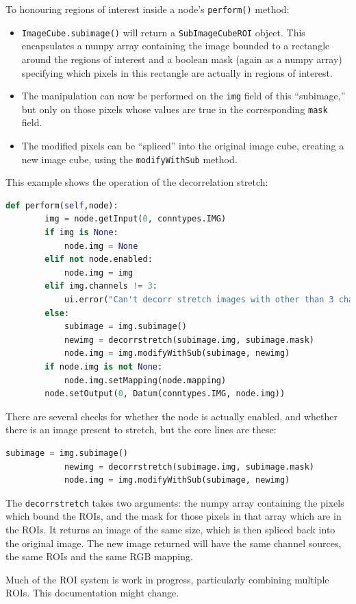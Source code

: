To honouring regions of interest inside a node's \texttt{perform()} method:
\begin{itemize}
\item \texttt{ImageCube.subimage()} will return a \texttt{SubImageCubeROI} object. This encapsulates
a numpy array containing the image bounded to a rectangle around the regions of interest and
a boolean mask (again as a numpy array) specifying which pixels in this rectangle are actually
in regions of interest.
\item The manipulation can now be performed on the \texttt{img} field of this ``subimage,'' but
only on those pixels whose values are true in the corresponding \texttt{mask} field.
\item The modified pixels can be ``spliced'' into the original image cube, creating a new image
cube, using the \texttt{modifyWithSub} method.
\end{itemize}
This example shows the operation of the decorrelation stretch:
\begin{lstlisting}[language=Python]
    def perform(self,node):
        img = node.getInput(0, conntypes.IMG)
        if img is None:
            node.img = None
        elif not node.enabled:
            node.img = img
        elif img.channels != 3:
            ui.error("Can't decorr stretch images with other than 3 channels")
        else:
            subimage = img.subimage()
            newimg = decorrstretch(subimage.img, subimage.mask)
            node.img = img.modifyWithSub(subimage, newimg)
        if node.img is not None:
            node.img.setMapping(node.mapping)
        node.setOutput(0, Datum(conntypes.IMG, node.img))
\end{lstlisting}
There are several checks for whether the node is actually enabled, and whether there is an image
present to stretch, but the core lines are these:
\begin{lstlisting}[language=Python]
            subimage = img.subimage()
            newimg = decorrstretch(subimage.img, subimage.mask)
            node.img = img.modifyWithSub(subimage, newimg)
\end{lstlisting}
The \texttt{decorrstretch} takes two arguments: the numpy array containing the pixels which bound
the ROIs, and the mask for those pixels in that array which are in the ROIs. It returns an image
of the same size, which is then spliced back into the original image. The new image returned
will have the same channel sources, the same ROIs and the same RGB mapping.

\begin{notebox}
Much of the ROI system is work in progress, particularly combining
multiple ROIs. This documentation might change.
\end{notebox}


